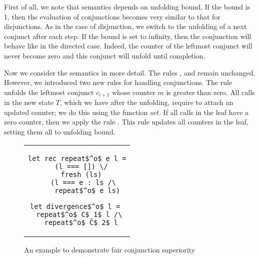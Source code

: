 First of all, we note that semantics depends on unfolding bound. If the bound is 1, then the evaluation of conjunctions becomes very similar to that for disjunctions. As in the case of
disjunction, we switch to the unfolding of a next conjunct after each step. If the bound is set to infinity, then the conjunction will behave like in the directed case. Indeed,
the counter of the leftmost conjunct will never become zero and this conjunct will unfold until completion.

Now we consider the semantics in more detail. The rules ,  and  remain unchanged. However, we introduced two new rules for handling conjunctions.
The rule  unfolds the leftmost conjunct $c_{i + 1}$ whose counter $m$ is greater than zero. All calls in the new state $T$, which we have after the unfolding,
require to attach an updated counter; we do this using the function $set$. If all calls in the leaf have a zero counter, then we apply the rule .
This rule updates all counters in the leaf, setting them all to unfolding bound.

\begin{figure}[h]
\centering
\begin{tabular}{c}
\begin{lstlisting}
let rec repeat$^o$ e l =
  (l === []) \/
  fresh (ls)
    (l === e : ls /\ 
     repeat$^o$ e ls)
     
let divergence$^o$ l = 
  repeat$^o$ C$_1$ l /\ 
  repeat$^o$ C$_2$ l
\end{lstlisting}
\end{tabular}

\caption{An example to demonstrate fair conjunction superiority}
\label{fair:lst-repeato}
\end{figure}

